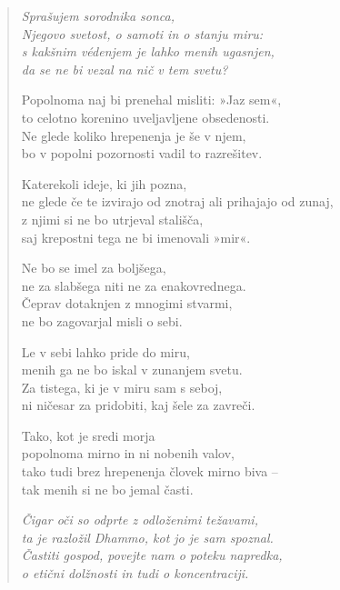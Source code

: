 \begin{verse}


\emph{Sprašujem sorodnika sonca,}\\
\emph{Njegovo svetost, o samoti in o stanju miru:}\\
\emph{s kakšnim védenjem je lahko menih ugasnjen,}\\
\emph{da se ne bi vezal na nič v tem svetu?}

Popolnoma naj bi prenehal misliti: »Jaz sem«,\\
to celotno korenino uveljavljene obsedenosti.\\
Ne glede koliko hrepenenja je še v njem,\\
bo v popolni pozornosti vadil to razrešitev.

Katerekoli ideje, ki jih pozna,\\
ne glede če te izvirajo od znotraj ali prihajajo od zunaj,\\
z njimi si ne bo utrjeval stališča,\\
saj krepostni tega ne bi imenovali »mir«.

Ne bo se imel za boljšega,\\
ne za slabšega niti ne za enakovrednega.\\
Čeprav dotaknjen z mnogimi stvarmi,\\
ne bo zagovarjal misli o sebi.

Le v sebi lahko pride do miru,\\
menih ga ne bo iskal v zunanjem svetu.\\
Za tistega, ki je v miru sam s seboj,\\
ni ničesar za pridobiti, kaj šele za zavreči.

Tako, kot je sredi morja\\
popolnoma mirno in ni nobenih valov,\\
tako tudi brez hrepenenja človek mirno biva --\\
tak menih si ne bo jemal časti.

\emph{Čigar oči so odprte z odloženimi težavami,}\\
\emph{ta je razložil Dhammo, kot jo je sam spoznal.}\\
\emph{Častiti gospod, povejte nam o poteku napredka,}\\
\emph{o etični dolžnosti in tudi o koncentraciji.}


\end{verse}
